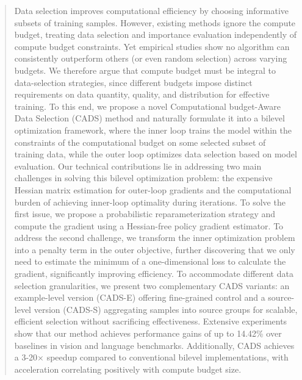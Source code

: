 \begin{abstract}
Data selection improves computational efficiency by choosing informative subsets of training samples. 
However, existing methods ignore the compute budget, treating data selection and importance evaluation independently of compute budget constraints. Yet empirical studies show no algorithm can consistently outperform others (or even random selection) across varying budgets. We therefore argue that compute budget must be integral to data-selection strategies, since different budgets impose distinct requirements on data quantity, quality, and distribution for effective training. 
To this end, we propose a novel Computational budget-Aware Data Selection (CADS) method and naturally formulate it into a bilevel optimization framework, where the inner loop trains the model within the constraints of the computational budget on some selected subset of training data, while the outer loop optimizes data selection based on model evaluation. 
Our technical contributions lie
in addressing two main challenges in solving this bilevel optimization problem: the expensive Hessian matrix estimation for outer-loop gradients and the computational burden of achieving inner-loop optimality during iterations. 
To solve the first issue, we propose a probabilistic reparameterization strategy and compute the gradient using a Hessian-free policy gradient estimator. To address the second challenge, we transform the inner optimization problem into a penalty term in the outer objective, further discovering that we only need to estimate the minimum of a one-dimensional loss to calculate the gradient, significantly improving efficiency. To accommodate different data selection granularities, we present two complementary CADS variants: an example-level version (CADS-E) offering fine-grained control and a source-level version (CADS-S) aggregating samples into source groups for scalable, efficient selection without sacrificing effectiveness.
Extensive experiments show that our method achieves performance gains of up to 14.42\% over baselines in vision and language benchmarks. 
Additionally, CADS achieves a 3-20× speedup compared to conventional bilevel implementations, with acceleration correlating positively with compute budget size.
\end{abstract}

